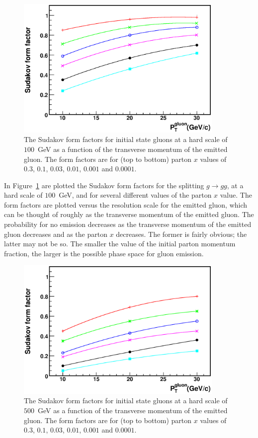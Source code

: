\documentclass[12pt]{iopart}
\begin{document}
%
\begin{figure}[t]
\begin{center}
\includegraphics[width=10cm,angle=0]{sudakov_gluon_100gev.eps}
\end{center}
\vspace*{-0.5cm}
\caption{The Sudakov form factors for initial state gluons at a hard scale of $100$~GeV as a
function of the transverse momentum of the emitted gluon. The form factors are for (top to bottom)
parton $x$ values of $0.3$, $0.1$, $0.03$, $0.01$, $0.001$ and $0.0001$.}
\label{fig:gluon_100}
\end{figure}

In Figure~\ref{fig:gluon_100} are plotted the Sudakov form factors for the splitting $g \rightarrow gg$, at a hard
scale of $100$~GeV, and for several different values of the parton $x$ value. The form factors are plotted versus
the resolution scale for the emitted gluon, which can be thought of roughly as the transverse momentum of the
emitted gluon. The probability for no emission decreases as the transverse momentum of the emitted gluon decreases
and as the parton $x$ decreases. The former is  fairly obvious; the latter  may not be so. The smaller the value
of  the initial parton momentum fraction, the larger is  the possible phase space for gluon emission. 

%
\begin{figure}[t]
\begin{center}
\includegraphics[width=10cm,angle=0]{sudakov_gluon_500gev.eps}
\end{center}
\vspace*{-0.5cm}
\caption{The Sudakov form factors for initial state gluons at a hard scale of $500$~GeV as a
function of the transverse momentum of the emitted gluon. The form factors are for (top to bottom)
parton $x$ values of $0.3$, $0.1$, $0.03$, $0.01$, $0.001$ and $0.0001$.}
\label{fig:gluon_500}
\end{figure}
\end{document}
